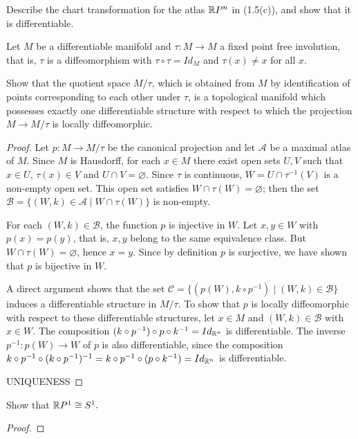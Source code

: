 \begin{problem}{3}
Describe the chart transformation for the atlas $\mathbb{R} P^n$ in (1.5(c)), and show that it is differentiable.
\end{problem}


\begin{problem}{4}
Let $M$ be a differentiable manifold and $\tau: M \rightarrow M$ a fixed point free involution, that is, $\tau$ is a diffeomorphism with $\tau \circ \tau = Id_M$ and $\tau(x) \neq x$ for all $x.$ 

Show that the quotient space $M/\tau$, which is obtained from $M$ by identification of points corresponding to each other under $\tau$, is a topological manifold which possesses exactly one differentiable structure with respect to which the projection $M \rightarrow M/\tau$ is locally diffeomorphic.
\end{problem}
\begin{proof}
Let $p: M \rightarrow M/\tau$ be the canonical projection and let $\mathcal A$ be a maximal atlas of $M$. Since $M$ is Hausdorff, for each $x \in M$ there exist open sets $U, V$ such that $x\in U$, $\tau(x) \in V$ and $U \cap V = \varnothing.$ Since $\tau$ is continuous, $W = U \cap \tau^{-1}(V)$ is a non-empty open set. This open set satisfies $W \cap \tau(W) = \varnothing$; then the set $\mathcal B = \{(W, k) \in \mathcal A \mid W \cap \tau(W) \}$ is non-empty.

For each $(W, k)\in \mathcal B$, the function $p$ is injective in $W$. Let $x, y \in W$ with $p(x) = p(y)$, that is, $x,y$ belong to the same equivalence class. But $W \cap \tau(W) = \varnothing$, hence $x=y.$ Since by definition $p$ is surjective, we have shown that $p$ is bijective in $W.$

A direct argument shows that the set $\mathcal C = \{(p(W), k \circ p^{-1}) \mid (W, k) \in \mathcal B \}$ induces a differentiable structure in $M/\tau$. To show that $p$ is locally diffeomorphic with respect to these differentiable structures, let $x \in M$ and $(W, k)\in \mathcal B$ with $x\in W$. The composition $(k \circ p^{-1}) \circ p \circ k^{-1} = Id_{\mathbb{R}^n}$ is differentiable. The inverse $p^{-1}: p(W) \rightarrow W$ of $p$ is also differentiable, since the composition $k \circ p^{-1}\circ (k \circ p^{-1})^{-1} = k \circ p^{-1} \circ (p \circ k^{-1}) = Id_{\mathbb{R}^n}$ is differentiable.

UNIQUENESS
\end{proof}

\begin{problem}{5}
Show that $\mathbb{R} P^1 \cong S^1.$
\end{problem}
\begin{proof}

\end{proof}

